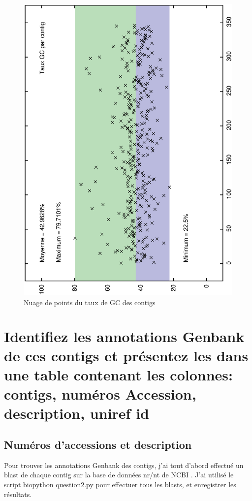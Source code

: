 \documentclass[10.9pt]{article} %
\begin{document}
\begin{figure}[p]
\includegraphics[scale=0.6,angle=270]{question_1/contigs_taux.eps}
\caption{Nuage de points du taux de GC des contigs}
\end{figure}


\newpage
\section{Identifiez les annotations Genbank de ces contigs et présentez les dans une table contenant
les colonnes: contigs, numéros Accession, description, uniref id} %

\subsection{Numéros d'accessions et description}
Pour trouver les annotations Genbank des contigs, j'ai tout d'abord effectué un blast de chaque contig
sur la base de données nr/nt de NCBI \cite{BLAST}. J'ai utilisé le script biopython question2.py pour
effectuer tous les blasts, et enregistrer les résultats.
\end{document}
